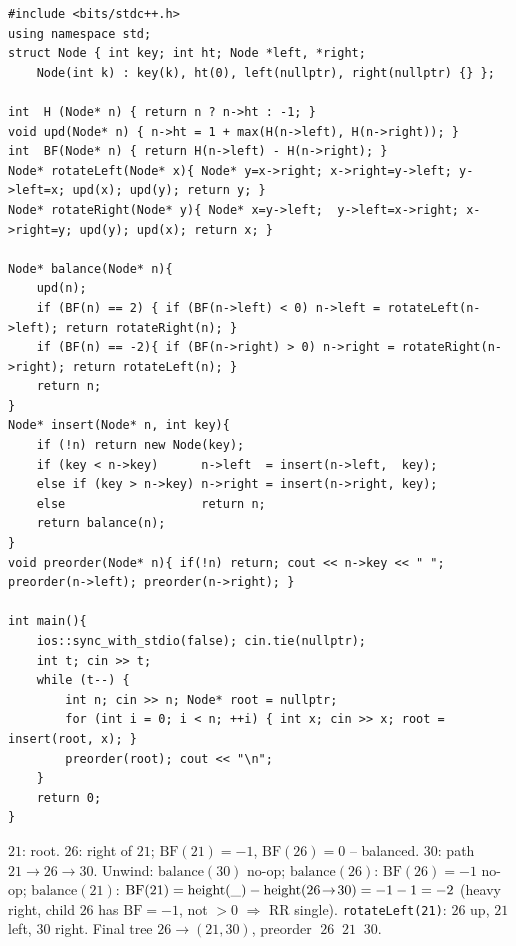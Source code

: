 \begin{lstlisting}[caption={AVL Tree Insertion -- height-carrying balance plus a preorder walk (GeeksforGeeks)}, label={lst:c06-avl-soln}]
#include <bits/stdc++.h>
using namespace std;
struct Node { int key; int ht; Node *left, *right;
    Node(int k) : key(k), ht(0), left(nullptr), right(nullptr) {} };

int  H (Node* n) { return n ? n->ht : -1; }
void upd(Node* n) { n->ht = 1 + max(H(n->left), H(n->right)); }
int  BF(Node* n) { return H(n->left) - H(n->right); }
Node* rotateLeft(Node* x){ Node* y=x->right; x->right=y->left; y->left=x; upd(x); upd(y); return y; }
Node* rotateRight(Node* y){ Node* x=y->left;  y->left=x->right; x->right=y; upd(y); upd(x); return x; }

Node* balance(Node* n){
    upd(n);
    if (BF(n) == 2) { if (BF(n->left) < 0) n->left = rotateLeft(n->left); return rotateRight(n); }
    if (BF(n) == -2){ if (BF(n->right) > 0) n->right = rotateRight(n->right); return rotateLeft(n); }
    return n;
}
Node* insert(Node* n, int key){
    if (!n) return new Node(key);
    if (key < n->key)      n->left  = insert(n->left,  key);
    else if (key > n->key) n->right = insert(n->right, key);
    else                   return n;
    return balance(n);
}
void preorder(Node* n){ if(!n) return; cout << n->key << " "; preorder(n->left); preorder(n->right); }

int main(){
    ios::sync_with_stdio(false); cin.tie(nullptr);
    int t; cin >> t;
    while (t--) {
        int n; cin >> n; Node* root = nullptr;
        for (int i = 0; i < n; ++i) { int x; cin >> x; root = insert(root, x); }
        preorder(root); cout << "\n";
    }
    return 0;
}
\end{lstlisting}

\begin{tracebox}
$21$: root. $26$: right of $21$; $\text{BF}(21)=-1$, $\text{BF}(26)=0$ -- balanced. $30$: path
$21\!\to\!26\!\to\!30$. Unwind: $\text{balance}(30)$ no-op; $\text{balance}(26)$: $\text{BF}(26)=-1$
no-op; $\text{balance}(21)$: $\text{BF}(21)=\operatorname{height}(\_)-\operatorname{height}(26\!\to\!30)=-1-1=-2$ (heavy right, child
$26$ has $\text{BF}=-1$, not $>0$ $\Rightarrow$ RR single). \texttt{rotateLeft(21)}: $26$ up, $21$ left,
$30$ right. Final tree $26\to(21,30)$, preorder $\;26\;\;21\;\;30$. \checkmark
\end{tracebox}


